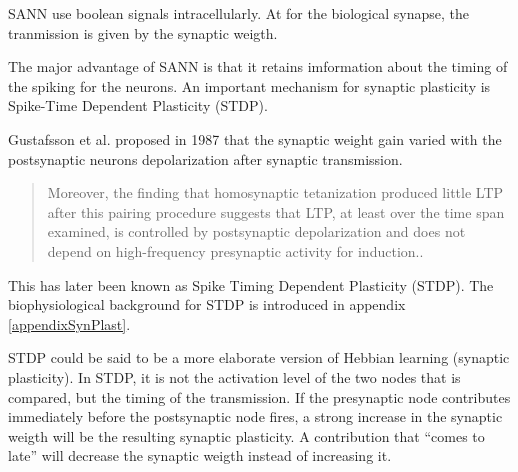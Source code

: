 SANN use boolean signals intracellularly. 
At for the biological synapse, the tranmission is given by the synaptic weigth. 

The major advantage of SANN is that it retains imformation about the timing of the spiking for the neurons.  %
An important mechanism for synaptic plasticity is Spike-Time Dependent Plasticity (STDP).

Gustafsson et al. proposed in 1987 that the synaptic weight gain varied with the postsynaptic neurons depolarization after synaptic transmission\cite{Gustafsson03011987}. 
\begin{quote}
Moreover, the finding that homosynaptic tetanization produced little LTP after this pairing procedure suggests that LTP, at least over the time span examined, is controlled by postsynaptic depolarization and does not depend on high-frequency presynaptic activity for induction.\cite{Gustafsson03011987}.
\end{quote}
This has later been known as Spike Timing Dependent Plasticity (STDP)\cite{reviewSTDP}. 
The biophysiological background for STDP is introduced in appendix \ref{appendixSynPlast}.

STDP could be said to be a more elaborate version of Hebbian learning (synaptic plasticity). 
In STDP, it is not the activation level of the two nodes that is compared, but the timing of the transmission.
If the presynaptic node contributes immediately before the postsynaptic node fires, a strong increase in the synaptic weigth will be the resulting synaptic plasticity.
A contribution that ``comes to late'' will decrease the synaptic weigth instead of increasing it\cite{reviewSTDP}.



